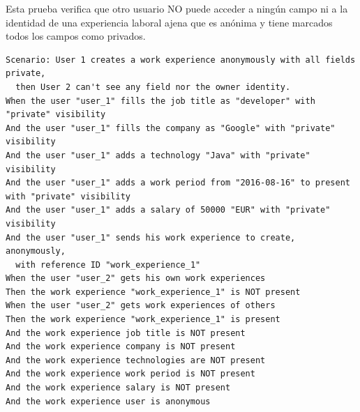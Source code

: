 \documentclass[a4paper, 12pt]{book}
\begin{document}
    Esta prueba verifica que otro usuario NO puede acceder a ningún campo ni a la identidad de una experiencia
    laboral ajena que es anónima y tiene marcados todos los campos como privados.
        {\scriptsize
    \linespread{1}
    \begin{verbatim}
Scenario: User 1 creates a work experience anonymously with all fields private,
  then User 2 can't see any field nor the owner identity.
When the user "user_1" fills the job title as "developer" with "private" visibility
And the user "user_1" fills the company as "Google" with "private" visibility
And the user "user_1" adds a technology "Java" with "private" visibility
And the user "user_1" adds a work period from "2016-08-16" to present with "private" visibility
And the user "user_1" adds a salary of 50000 "EUR" with "private" visibility
And the user "user_1" sends his work experience to create, anonymously,
  with reference ID "work_experience_1"
When the user "user_2" gets his own work experiences
Then the work experience "work_experience_1" is NOT present
When the user "user_2" gets work experiences of others
Then the work experience "work_experience_1" is present
And the work experience job title is NOT present
And the work experience company is NOT present
And the work experience technologies are NOT present
And the work experience work period is NOT present
And the work experience salary is NOT present
And the work experience user is anonymous

    \end{verbatim}
    }
\end{document}
